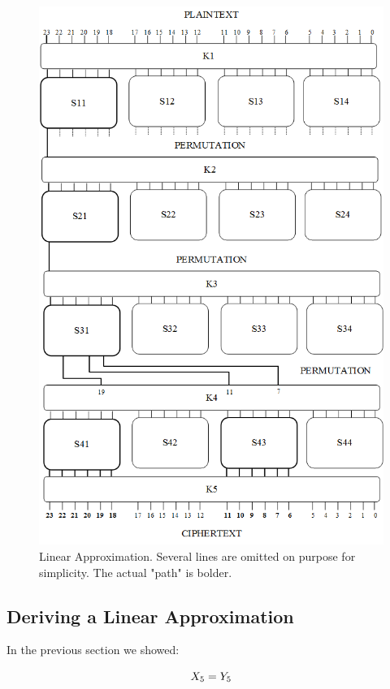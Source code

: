 \documentclass[11pt]{article}
\begin{document}
\begin{figure}[htp]
\centering
\includegraphics[scale=0.75]{SPN.png}
\caption{Linear Approximation. Several lines are omitted on purpose for simplicity. The actual "path" is bolder.}
\label{fig:approx}
\end{figure}


\subsection{Deriving a Linear Approximation}

In the previous section we showed:

\begin{equation}
 X_5 = Y_5 \\
\label{x5y5}
\end{equation}
\end{document}
